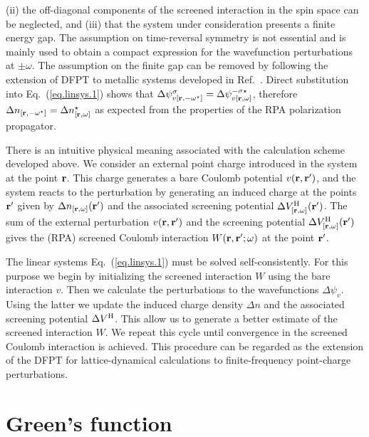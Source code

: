 \documentclass[twocolumn,prb,showpacs,superscriptaddress]{revtex4}
\def\w{\omega}
\def\s{\sigma}
\def\r{{\bf r}}
\def\rp{{\bf r^\prime}}
\begin{document}
(ii) the off-diagonal components of the screened interaction in the spin space
can be neglected, and (iii) that the system under consideration presents a finite 
energy gap. The assumption on time-reversal symmetry is not essential and is mainly used to
obtain a compact expression for the wavefunction perturbations at
$\pm\w$. The assumption on the finite gap can be removed by following the extension
of DFPT to metallic systems developed in Ref.\ . 
Direct substitution into Eq.\ (\ref{eq.linsys.1}) shows that 
$\Delta \psi^\s_{v[\r,-\w^\star]} = \Delta \psi_{v[\r,\w]}^{-\s\star}$,
therefore $\Delta n_{[\r,-\w^\star]}=\Delta n^\star_{[\r,\w]}$ as expected
from the properties of the RPA polarization propagator.

There is an intuitive physical meaning associated with the calculation scheme developed above.
We consider an external point charge introduced in the system
at the point $\r$. This charge generates a bare Coulomb potential $v(\r,\rp)$,
and the system reacts to the perturbation by generating an induced charge
at the points $\rp$ given by $\Delta n_{[\r,\w]}(\rp)$ and the associated 
screening potential $\Delta V^{\rm H}_{[\r,\w]}(\rp)$.
The sum of the external perturbation $v(\r,\rp)$ and the screening
potential $\Delta V^{\rm H}_{[\r,\w]}(\rp)$ gives the (RPA) screened Coulomb
interaction $W(\r,\rp;\w)$ at the point $\rp$.

The linear systems Eq.\ (\ref{eq.linsys.1}) must be solved self-consistently.
For this purpose we begin by initializing the screened
interaction $W$ using the bare interaction $v$. 
Then we calculate the perturbations to the wavefunctions $\Delta \psi_v$.
Using the latter we update the induced charge density $\Delta n$
and the associated screening potential $\Delta V^{\rm H}$. This allow us to
generate a better estimate of the screened interaction $W$.
We repeat this cycle until convergence in the screened Coulomb
interaction is achieved. This procedure can be regarded as the extension
of the DFPT for lattice-dynamical calculations to finite-frequency
point-charge perturbations.

\section{Green's function}\label{sec.green}
\end{document}
